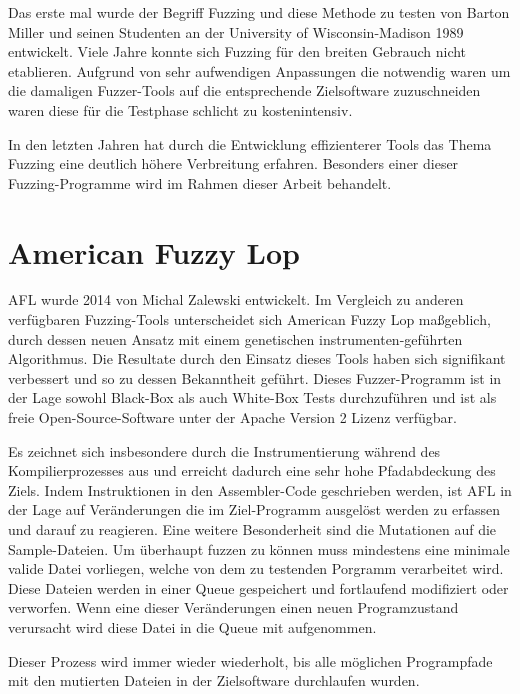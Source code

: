 \documentclass[12pt,a4paper]{scrreprt}
\begin{document}
Das erste mal wurde der Begriff Fuzzing und diese Methode zu testen von Barton Miller und seinen Studenten an der University of Wisconsin-Madison 1989 entwickelt.
Viele Jahre konnte sich Fuzzing für den breiten Gebrauch nicht etablieren. Aufgrund von sehr aufwendigen Anpassungen die notwendig waren um die damaligen Fuzzer-Tools auf die entsprechende Zielsoftware zuzuschneiden waren diese für die Testphase schlicht zu kostenintensiv. 

In den letzten Jahren hat durch die Entwicklung effizienterer Tools das Thema Fuzzing eine deutlich höhere Verbreitung erfahren. Besonders einer dieser Fuzzing-Programme wird im Rahmen dieser Arbeit behandelt.   

\newpage

\section{American Fuzzy Lop}
AFL wurde 2014 von Michal Zalewski entwickelt. Im Vergleich zu anderen verfügbaren Fuzzing-Tools unterscheidet sich American Fuzzy Lop maßgeblich, durch dessen neuen Ansatz mit einem genetischen instrumenten-geführten Algorithmus. Die Resultate durch den Einsatz dieses Tools haben sich signifikant verbessert und so zu dessen Bekanntheit geführt. 
Dieses Fuzzer-Programm ist in der Lage sowohl Black-Box als auch White-Box Tests durchzuführen und ist als freie Open-Source-Software unter der Apache Version 2 Lizenz verfügbar. 

Es zeichnet sich insbesondere durch die Instrumentierung während des Kompilierprozesses aus und erreicht dadurch eine sehr hohe Pfadabdeckung des Ziels. Indem Instruktionen in den Assembler-Code geschrieben werden, ist AFL in der Lage auf Veränderungen die im Ziel-Programm ausgelöst werden zu erfassen und darauf zu reagieren.
Eine weitere Besonderheit sind die Mutationen auf die Sample-Dateien. Um überhaupt fuzzen zu können muss mindestens eine minimale valide Datei vorliegen, welche von dem zu testenden Porgramm verarbeitet wird. Diese Dateien werden in einer Queue gespeichert und fortlaufend modifiziert oder verworfen. Wenn eine dieser Veränderungen einen neuen Programzustand verursacht wird diese Datei in die Queue mit aufgenommen.

Dieser Prozess wird immer wieder wiederholt, bis alle möglichen Programpfade mit den mutierten Dateien in der Zielsoftware durchlaufen wurden.
\end{document}
